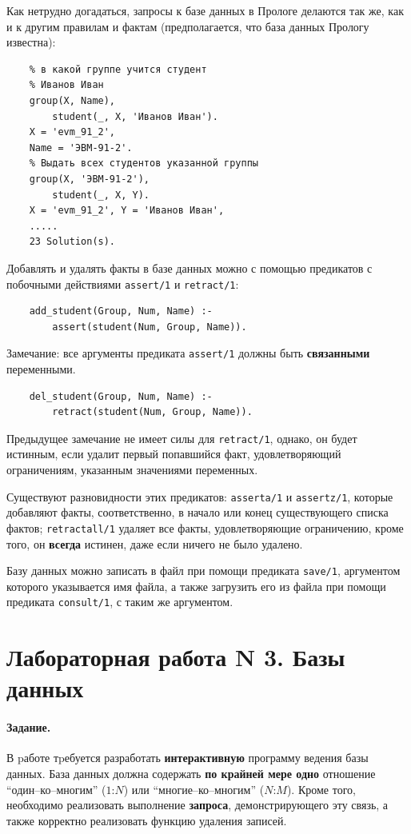 \documentclass[12pt, openany, twoside]{book} %
\begin{document}
\noindent Как нетрудно догадаться, запросы к базе данных
в Прологе делаются так же, как и к другим правилам и фактам
(предполагается, что база данных Прологу известна):
{\tt\begin{verbatim}
    % в какой группе учится студент
    % Иванов Иван
    group(X, Name),
        student(_, X, 'Иванов Иван').
    X = 'evm_91_2',
    Name = 'ЭВМ-91-2'.
    % Выдать всех студентов указанной группы
    group(X, 'ЭВМ-91-2'),
        student(_, X, Y).
    X = 'evm_91_2', Y = 'Иванов Иван',
    .....
    23 Solution(s).
\end{verbatim}}

Добавлять и удалять факты в базе данных можно с помощью предикатов с
побочными действиями {\tt assert/1} и {\tt retract/1}:

{\tt\begin{verbatim}
    add_student(Group, Num, Name) :-
        assert(student(Num, Group, Name)).
\end{verbatim}}

\noindent Замечание: все аргументы предиката {\tt assert/1}
должны быть {\bf связанными} переменными.

{\tt\begin{verbatim}
    del_student(Group, Num, Name) :-
        retract(student(Num, Group, Name)).
\end{verbatim}}
\noindent Предыдущее замечание не имеет силы для {\tt retract/1}, однако,
он будет истинным, если удалит первый попавшийся факт, удовлетворяющий
ограничениям, указанным значениями переменных.

Существуют разновидности этих предикатов: {\tt asserta/1} и {\tt assertz/1},
которые добавляют факты, соответственно, в начало или конец существующего
списка фактов; {\tt retractall/1} удаляет все факты,
удовлетворяющие ограничению, кроме того, он {\bf всегда} истинен,
даже если ничего не было удалено.

Базу данных можно записать в файл при помощи предиката {\tt save/1},
аргументом которого указывается имя файла, а также загрузить его из
файла при помощи предиката {\tt consult/1}, с таким же аргументом.

\section{Лабораторная работа N 3. Базы данных}
\paragraph{Задание.} В pаботе
тpебуется разработать {\bf интерактивную} программу ведения базы данных.
База данных должна содержать {\bf по крайней мере одно}
отношение ``один--ко--многим'' ($1$:$N$) или ``многие--ко--многим''
($N$:$M$).
Кроме того, необходимо
реализовать выполнение {\bf запроса}, демонстрирующего эту связь, а также
корректно реализовать функцию удаления записей.
\end{document}
